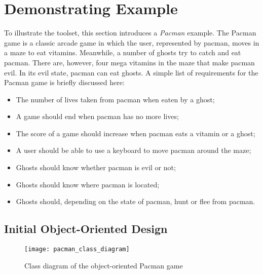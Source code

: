 \newpage
\section{Demonstrating Example}
\label{sec:demonstratingexample}

To illustrate the \Compose* toolset, this section introduces a \emph{Pacman} example.
The Pacman game is a classic arcade game in which the user, represented by pacman, moves in a maze to eat vitamins.
Meanwhile, a number of ghosts try to catch and eat pacman.
There are, however, four mega vitamins in the maze that make pacman evil.
In its evil state, pacman can eat ghosts.
A simple list of requirements for the Pacman game is briefly discussed here:
\begin{itemize}[noitemsep]
  \item The number of lives taken from pacman when eaten by a ghost;
  \item A game should end when pacman has no more lives;
  \item The score of a game should increase when pacman eats a vitamin or a ghost;
  \item A user should be able to use a keyboard to move pacman around the maze;
  \item Ghosts should know whether pacman is evil or not;
  \item Ghosts should know where pacman is located;
  \item Ghosts should, depending on the state of pacman, hunt or flee from pacman.
\end{itemize}

\subsection{Initial Object-Oriented Design}

\begin{figure}[p]
  \centering
  \texttt{[image: pacman\_class\_diagram]}
  \caption{Class diagram of the object-oriented Pacman game}
  \label{fig:pacman_class_diagram}
\end{figure}

